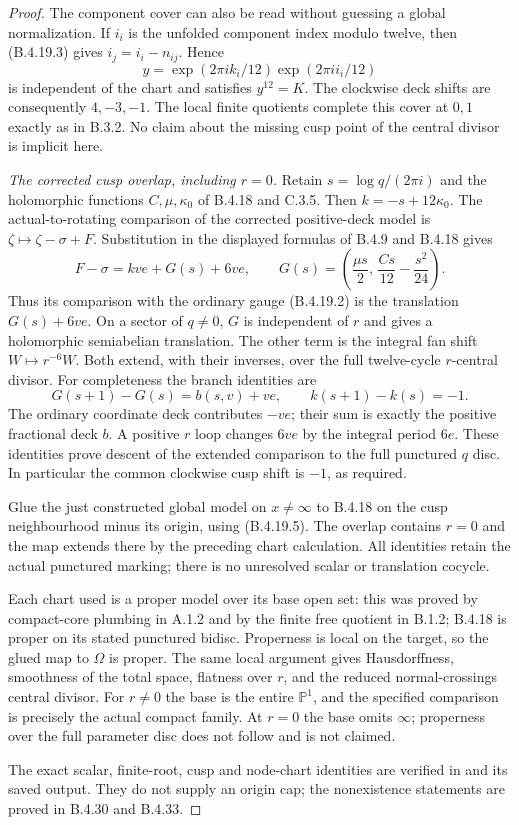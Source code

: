 \begin{proof}
The component cover can also be read without
guessing a global normalization. If $i_i$ is the
unfolded component index modulo twelve, then
(B.4.19.3) gives $i_j=i_i-n_{ij}$. Hence
\[
 y=\exp(2\pi i k_i/12)\exp(2\pi i i_i/12)
\]
is independent of the chart and satisfies $y^{12}=K$.
The clockwise deck shifts are consequently $4,-3,-1$.
The local finite quotients complete this cover at
$0,1$ exactly as in B.3.2. No claim about the missing
cusp point of the central divisor is implicit here.

\emph{The corrected cusp overlap, including $r=0$.}
Retain $s=\log q/(2\pi i)$ and the holomorphic
functions $C,\mu,\kappa_0$ of B.4.18 and C.3.5.
Then $k=-s+12\kappa_0$. The actual-to-rotating
comparison of the corrected positive-deck model is
$\zeta\mapsto\zeta-\sigma+F$. Substitution in the
displayed formulas of B.4.9 and B.4.18 gives
\[
 F-\sigma=kve+G(s)+6ve,
 \qquad
 G(s)=\left(\frac{\mu s}{2},\,
                    \frac{Cs}{12}-\frac{s^2}{24}\right).
 \tag{B.4.19.5}
\]
Thus its comparison with the ordinary gauge
(B.4.19.2) is the translation $G(s)+6ve$.
On a sector of $q\ne0$, $G$ is independent of $r$
and gives a holomorphic semiabelian translation.
The other term is the integral fan shift
$W\mapsto r^{-6}W$. Both extend, with their inverses,
over the full twelve-cycle $r$-central divisor.
For completeness the branch identities are
\[
 G(s+1)-G(s)=b(s,v)+ve,
 \qquad k(s+1)-k(s)=-1.
\]
The ordinary coordinate deck contributes $-ve$;
their sum is exactly the positive fractional deck
$b$. A positive $r$ loop changes $6ve$ by the
integral period $6e$. These identities prove
descent of the extended comparison to the full
punctured $q$ disc. In particular the common
clockwise cusp shift is $-1$, as required.

Glue the just constructed global model on
$x\ne\infty$ to B.4.18 on the cusp neighbourhood
minus its origin, using (B.4.19.5). The overlap
contains $r=0$ and the map extends there by the
preceding chart calculation. All identities
retain the actual punctured marking; there is no
unresolved scalar or translation cocycle.

Each chart used is a proper model over its base
open set: this was proved by compact-core plumbing
in A.1.2 and by the finite free quotient in B.1.2;
B.4.18 is proper on its stated punctured bidisc.
Properness is local on the target, so the glued
map to $\Omega$ is proper. The same local argument
gives Hausdorffness, smoothness of the total space,
flatness over $r$, and the reduced normal-crossings
central divisor. For $r\ne0$ the base is the entire
$\mathbb P^1$, and the specified comparison is
precisely the actual compact family. At $r=0$ the
base omits $\infty$; properness over the full
parameter disc does not follow and is not claimed.

The exact scalar, finite-root, cusp and node-chart
identities are verified in
 and its
saved output. They do not supply an origin cap; the
nonexistence statements are proved in B.4.30 and B.4.33.
\end{proof}
